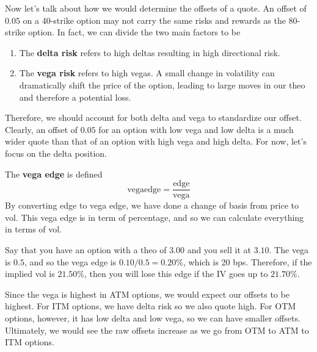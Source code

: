 \documentclass{article}
\begin{document}
    Now let's talk about how we would determine the offsets of a quote. An offset of $0.05$ on a 40-strike option may not carry the same risks and rewards as the 80-strike option. In fact, we can divide the two main factors to be

    \begin{enumerate}
      \item The \textbf{delta risk} refers to high deltas resulting in high directional risk.
      \item The \textbf{vega risk} refers to high vegas. A small change in volatility can dramatically shift the price of the option, leading to large moves in our theo and therefore a potential loss.
    \end{enumerate}

     Therefore, we should account for both delta and vega to standardize our offset. Clearly, an offset of $0.05$ for an option with low vega and low delta is a much wider quote than that of an option with high vega and high delta. For now, let's focus on the delta position.

    \begin{definition}
      \label{def:vega-edge}
      The \textbf{vega edge} is defined
      \begin{equation}
        \mathrm{vega edge} = \frac{\text{edge}}{\text{vega}}
      \end{equation}
      By converting edge to vega edge, we have done a change of basis from price to vol. This vega edge is in term of percentage, and so we can calculate everything in terms of vol.
    \end{definition}

    \begin{example}
      \label{ex:vega-edge-breakeven-point}
      Say that you have an option with a theo of $3.00$ and you sell it at $3.10$. The vega is $0.5$, and so the vega edge is $0.10 / 0.5 = 0.20\%$, which is 20 bps. Therefore, if the implied vol is $21.50\%$, then you will lose this edge if the IV goes up to $21.70\%$.
    \end{example}

     Since the vega is highest in ATM options, we would expect our offsets to be highest. For ITM options, we have delta risk so we also quote high. For OTM options, however, it has low delta and low vega, so we can have smaller offsets. Ultimately, we would see the raw offsets increase as we go from OTM to ATM to ITM options.
\end{document}
